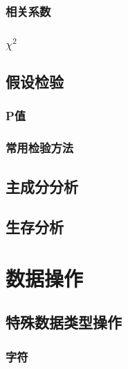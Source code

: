 \documentclass[]{book}
\begin{document}
\hypertarget{section-23}{%
\subsection{相关系数}\label{section-23}}

\hypertarget{chi2}{%
\subsection{\texorpdfstring{\(\chi^2\)}{\textbackslash{}chi\^{}2}}\label{chi2}}

\hypertarget{section-24}{%
\section{假设检验}\label{section-24}}

\hypertarget{p}{%
\subsection{P值}\label{p}}

\hypertarget{section-25}{%
\subsection{常用检验方法}\label{section-25}}

\hypertarget{section-26}{%
\section{主成分分析}\label{section-26}}

\hypertarget{section-27}{%
\section{生存分析}\label{section-27}}

\hypertarget{section-28}{%
\chapter{数据操作}\label{section-28}}

\hypertarget{section-29}{%
\section{特殊数据类型操作}\label{section-29}}

\hypertarget{section-30}{%
\subsection{字符}\label{section-30}}
\end{document}

